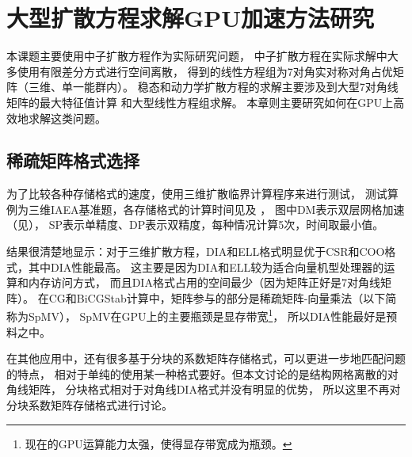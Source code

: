 

\chapter{大型扩散方程求解GPU加速方法研究}

本课题主要使用中子扩散方程作为实际研究问题，
中子扩散方程在实际求解中大多使用有限差分方式进行空间离散，
得到的线性方程组为7对角实对称对角占优矩阵（三维、单一能群内）。
稳态和动力学扩散方程的求解主要涉及到大型7对角线矩阵的最大特征值计算
和大型线性方程组求解。
本章则主要研究如何在GPU上高效地求解这类问题。

\section{稀疏矩阵格式选择}

为了比较各种存储格式的速度，使用三维扩散临界计算程序来进行测试，
测试算例为三维IAEA基准题，各存储格式的计算时间见及
，
图中DM表示双层网格加速（见），
SP表示单精度、DP表示双精度，每种情况计算5次，时间取最小值。

结果很清楚地显示：对于三维扩散方程，DIA和ELL格式明显优于CSR和COO格式，其中DIA性能最高。
这主要是因为DIA和ELL较为适合向量机型处理器的运算和内存访问方式，
而且DIA格式占用的空间最少（因为矩阵正好是7对角线矩阵）。
在CG和BiCGStab计算中，矩阵参与的部分是稀疏矩阵-向量乘法（以下简称为SpMV），
SpMV在GPU上的主要瓶颈是显存带宽\cite{bell2008spmv,baskaran2008optimizing}\footnote{现在的GPU运算能力太强，使得显存带宽成为瓶颈。}，
所以DIA性能最好是预料之中。

在其他应用中，还有很多基于分块的系数矩阵存储格式，可以更进一步地匹配问题的特点，
相对于单纯的使用某一种格式要好。但本文讨论的是结构网格离散的对角线矩阵，
分块格式相对于对角线DIA格式并没有明显的优势，
所以这里不再对分块系数矩阵存储格式进行讨论。

